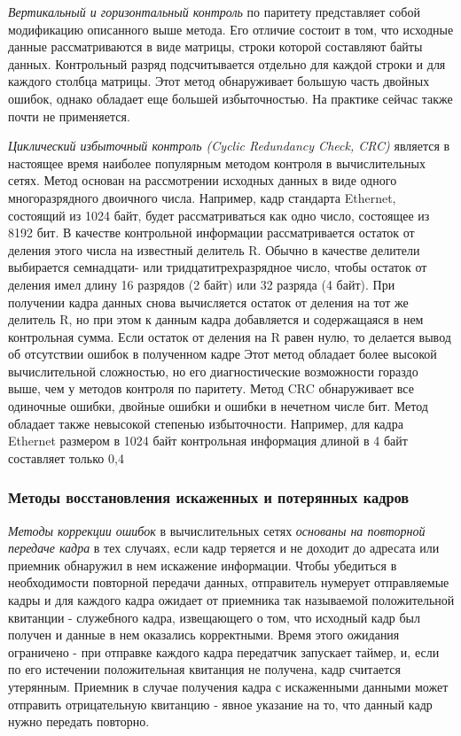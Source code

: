 \emph{Вертикальный и горизонтальный контроль} по паритету представляет собой модификацию описанного выше метода.
Его отличие состоит в том, что исходные данные рассматриваются в виде матрицы, строки которой составляют байты данных.
Контрольный разряд подсчитывается отдельно для каждой строки и для каждого столбца матрицы.
Этот метод обнаруживает большую часть двойных ошибок, однако обладает еще большей избыточностью.
На практике сейчас также почти не применяется.

\emph{Циклический избыточный контроль (Cyclic Redundancy Check, CRC)} является в настоящее время наиболее популярным методом контроля в вычислительных сетях.
Метод основан на рассмотрении исходных данных в виде одного многоразрядного двоичного числа.
Например, кадр стандарта Ethernet, состоящий из 1024 байт, будет рассматриваться как одно число, состоящее из 8192 бит.
В качестве контрольной информации рассматривается остаток от деления этого числа на известный делитель R.
Обычно в качестве делители выбирается семнадцати- или тридцатитрехразрядное число, чтобы остаток от деления имел длину 16 разрядов (2 байт) или 32 разряда (4 байт).
При получении кадра данных снова вычисляется остаток от деления на тот же делитель R, но при этом к данным кадра добавляется и содержащаяся в нем контрольная сумма.
Если остаток от деления на R равен нулю, то делается вывод об отсутствии ошибок в полученном кадре
Этот метод обладает более высокой вычислительной сложностью, но его диагностические возможности гораздо выше, чем у методов контроля по паритету.
Метод CRC обнаруживает все одиночные ошибки, двойные ошибки и ошибки в нечетном числе бит.
Метод обладает также невысокой степенью избыточности.
Например, для кадра Ethernet размером в 1024 байт контрольная информация длиной в 4 байт составляет только 0,4 %

\subsubsection{Методы восстановления искаженных и потерянных кадров}

\emph{Методы коррекции ошибок} в вычислительных сетях \emph{основаны на повторной передаче кадра} в тех случаях, если кадр теряется и не доходит до адресата или приемник обнаружил в нем искажение информации.
Чтобы убедиться в необходимости повторной передачи данных, отправитель нумерует отправляемые кадры и для каждого кадра ожидает от приемника так называемой положительной квитанции - служебного кадра, извещающего о том, что исходный кадр был получен и данные в нем оказались корректными.
Время этого ожидания ограничено - при отправке каждого кадра передатчик запускает таймер, и, если по его истечении положительная квитанция не получена, кадр считается утерянным.
Приемник в случае получения кадра с искаженными данными может отправить отрицательную квитанцию - явное указание на то, что данный кадр нужно передать повторно.

